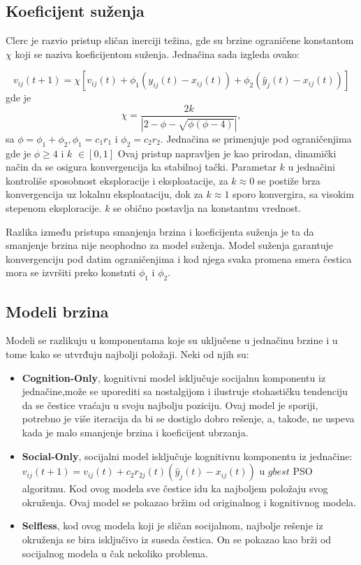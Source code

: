\documentclass[a4paper]{article}
\begin{document}
\subsection{Koeficijent suženja}
Clerc je razvio pristup sličan inerciji težina, gde su brzine ograničene konstantom $\chi$ koji se naziva koeficijentom suženja. Jednačina sada izgleda ovako:

\[v_{ij} (t + 1) = \chi[v_{ij} (t) + \phi_1 (y_{ij} (t) - x_{ij} (t)) + \phi_2 (\hat{y}_j (t) - x_{ij} (t))]\]
gde je $$\chi = \frac{2k}{|2-\phi-\sqrt{\phi(\phi-4)}|},$$sa $\phi = \phi_1 +  \phi_2 , \phi_1 = c_1r_1$ i $\phi_2 = c_2r_2$.
Jednačina se primenjuje pod ograničenjima gde je $\phi \geq 4$ i $k$ $\in [0, 1]$
Ovaj pristup napravljen je kao prirodan, dinamički način da se osigura konvergencija ka stabilnoj tački.
Parametar $k$ u jednačini kontroliše sposobnost eksploracije i eksploatacije, za $k \approx 0$ se postiže brza konvergencija uz lokalnu eksploataciju, dok za  $k \approx 1$ sporo konvergira, sa visokim stepenom eksploracije. $k$ se obično postavlja na konstantnu vrednost.

Razlika između pristupa smanjenja brzina i koeficijenta suženja je ta da smanjenje brzina nije neophodno za model suženja. Model suženja garantuje konvergenciju pod datim ograničenjima i kod njega svaka promena smera čestica mora se izvršiti preko konstnti $\phi_1$ i $\phi_2$.

\subsection{Modeli brzina}
Modeli se razlikuju u komponentama koje su uključene u jednačinu brzine i u tome kako se utvrđuju najbolji položaji. Neki od njih su:
\begin{itemize}
    \item \textbf{Cognition-Only}, kognitivni model isključuje socijalnu komponentu iz jednačine,može se uporediti sa nostalgijom i ilustruje stohastičku tendenciju  da se čestice vraćaju u svoju najbolju poziciju. Ovaj model je sporiji, potrebno je više iteracija da bi se dostiglo dobro rešenje, a, takođe, ne uspeva kada je malo smanjenje brzina i koeficijent ubrzanja.
    \item \textbf{Social-Only}, socijalni model isključuje kognitivnu komponentu iz jednačine: $v_{ij} (t + 1) = v_{ij} (t) + c_2r_{2j} (t)(\hat{y}_j (t) - x_{ij} (t))$ u $gbest$ PSO algoritmu. Kod ovog modela sve čestice idu ka najboljem položaju svog okruženja. Ovaj model se pokazao bržim od originalnog i kognitivnog modela.
    \item \textbf{Selfless}, kod ovog modela koji je sličan socijalnom, najbolje rešenje iz okruženja se bira isključivo iz suseda čestica. On se pokazao kao brži od socijalnog modela u čak nekoliko problema.
\end{itemize}
\end{document}
